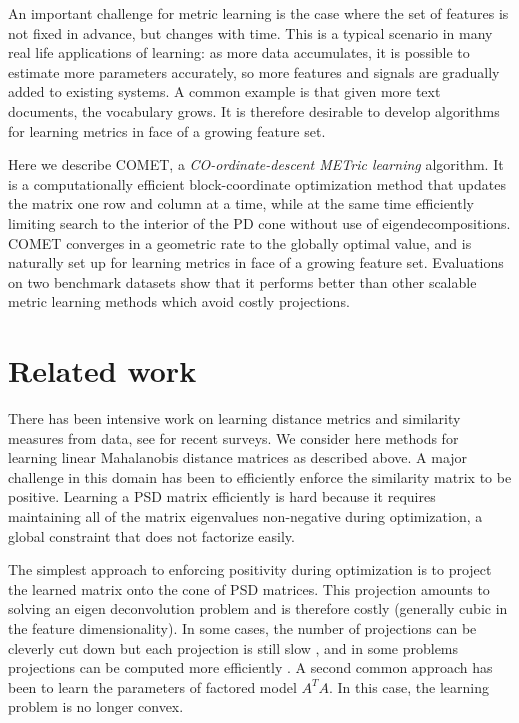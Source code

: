 \documentclass{article}
\begin{document}
An important challenge for metric learning is the case where the set of features is not fixed in advance, but changes with time. This is a typical scenario in many real life applications of learning: as more data accumulates, it is possible to estimate more parameters accurately, so more features and signals are gradually added to existing systems. A common example is that given more text documents, the vocabulary grows. It is therefore desirable to develop algorithms for learning metrics in face of a growing feature set. 

Here we describe COMET, a {\em{CO-ordinate-descent METric learning}} algorithm. It is a computationally efficient block-coordinate optimization method that updates the matrix one row and column at a time, while at the same time efficiently limiting search to the interior of the PD cone without use of eigendecompositions. COMET converges in a geometric rate to the globally optimal value, and is naturally set up for learning metrics in face of a growing feature set. Evaluations on two benchmark datasets show that it performs better than other scalable metric learning methods which avoid costly projections. 



\section{Related work}
There has been intensive work on learning distance metrics and similarity measures from data, see \citet{bellet2013survey, kulis2012survey} for recent surveys. We consider here methods for learning linear Mahalanobis distance matrices as described above. A major challenge in this domain has been to efficiently enforce the similarity matrix to be positive. Learning a PSD matrix efficiently is hard because it requires maintaining all of the matrix eigenvalues non-negative during optimization, a global constraint that does not factorize easily.

The simplest approach to enforcing positivity during optimization is to project the learned matrix onto the cone of PSD matrices. This projection amounts to solving an eigen deconvolution problem and is therefore costly (generally cubic in the feature dimensionality). In some cases, the number of projections can be cleverly cut down but each projection is still slow \cite{qianHD, qian}, and in some problems projections can be computed more efficiently \cite{shalev2004online}. A second common approach has been to learn the parameters of factored model $A^TA$. In this case, the learning problem is no longer convex. 
\end{document}
